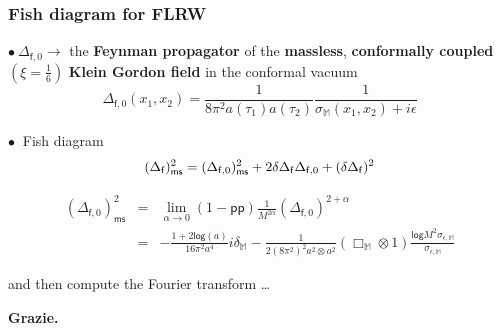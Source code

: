 \documentclass[9pt]{beamer}
\renewcommand{\log}{\mathsf{log}}
\newcommand{\ms}{\mathsf{ms}}
\newcommand{\pp}{\mathsf{pp}}
\newcommand{\Mbb}{\mathbb{M}}
\newcommand{\fsf}{\mathsf{f}}
\begin{document}
\begin{frame}

\frametitle{Fish diagram for FLRW} 

$\bullet \ \Delta_{\fsf,0} \to$ the \textbf{Feynman propagator} of the \textbf{massless}, \textbf{conformally coupled} $(\xi = \frac16)$ \textbf{Klein Gordon field} in the conformal vacuum
%
\begin{equation*}
\Delta_{\fsf,0}(x_1,x_2)=\frac{1}{8\pi^2 a(\tau_1)a(\tau_2)}\frac{1}{\sigma_{\Mbb}(x_1,x_2)+i\epsilon} 
\end{equation*}

$\bullet \ $ Fish diagram
\vspace*{-12pt}
\begin{equation*}
(\Delta_\fsf)^2_\ms = (\Delta_{\fsf,0})^2_\ms + 2 \delta\Delta_\fsf \Delta_{\fsf,0} + (\delta\Delta_\fsf)^2
\vspace*{-25pt}
\end{equation*}

\begin{eqnarray*}
(\Delta_{\fsf,0})^2_\ms &=& 
\lim_{\alpha\to 0} \left( 1 - \pp \right) \frac{1}{M^{2\alpha}} (\Delta_{\fsf,0})^{2+\alpha} \\
&=& - \frac{1+2\log(a)}{16\pi^2 a^4} i\delta_\Mbb-\frac{1}{2(8\pi^2)^2 a^2\otimes a^2} \left(\Box_{\Mbb}\otimes 1\right)\frac{\log{M^2\sigma_{\epsilon,\Mbb}}}{\sigma_{\epsilon,\Mbb}}
\end{eqnarray*}

and then compute the Fourier transform \dots

\end{frame}


{
\begin{frame}
\vspace*{220pt}
\textcolor{white!80!blue}{\bf \LARGE Grazie.}
\end{frame}
}
\end{document}
